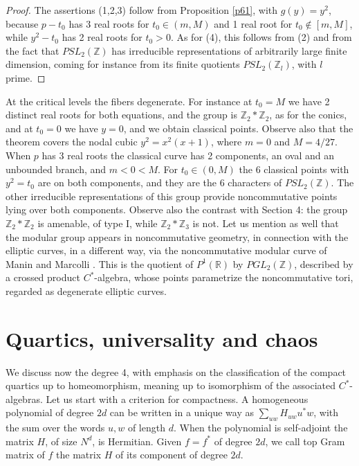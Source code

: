 \documentclass[11pt]{amsart}
\theoremstyle{definition}
\begin{document}
\begin{proof}
The assertions (1,2,3) follow from Proposition \ref{p61}, with $g(y)=y^2$, because $p-t_0$ has 3 real roots for $t_0\in(m,M)$ and 1 real root for $t_0\notin[m,M]$, while $y^2-t_0$ has 2 real roots for $t_0>0$. As for (4), this follows from (2) and from the fact that $PSL_2(\mathbb Z)$ has irreducible representations of arbitrarily large finite dimension, coming for instance from its finite quotients $PSL_2(\mathbb Z_l)$, with $l$ prime.
\end{proof}

At the critical levels the fibers degenerate. For instance at $t_0=M$ we have 2 distinct real roots for both equations, and the group is $\mathbb Z_2*\mathbb Z_2$, as for the conics, and at $t_0=0$ we have $y=0$, and we obtain classical points. Observe also that the theorem covers the nodal cubic $y^2=x^2(x+1)$, where $m=0$ and $M=4/27$. When $p$ has 3 real roots the classical curve has 2 components, an oval and an unbounded branch, and $m<0<M$. For $t_0\in(0,M)$ the 6 classical points with $y^2=t_0$ are on both components, and they are the 6 characters of $PSL_2(\mathbb Z)$. The other irreducible representations of this group provide noncommutative points lying over both components. Observe also the contrast with Section 4: the group $\mathbb Z_2*\mathbb Z_2$ is amenable, of type I, while $\mathbb Z_2*\mathbb Z_3$ is not. Let us mention as well that the modular group appears in noncommutative geometry, in connection with the elliptic curves, in a different way, via the noncommutative modular curve of Manin and Marcolli \cite{mma}. This is the quotient of $P^1(\mathbb R)$ by $PGL_2(\mathbb Z)$, described by a crossed product $C^*$-algebra, whose points parametrize the noncommutative tori, regarded as degenerate elliptic curves.

\section{Quartics, universality and chaos}

We discuss now the degree 4, with emphasis on the classification of the compact quartics up to homeomorphism, meaning up to isomorphism of the associated $C^*$-algebras. Let us start with a criterion for compactness. A homogeneous polynomial of degree $2d$ can be written in a unique way as $\sum_{uw}H_{uw}u^*w$, with the sum over the words $u,w$ of length $d$. When the polynomial is self-adjoint the matrix $H$, of size $N^d$, is Hermitian. Given $f=f^*$ of degree $2d$, we call top Gram matrix of $f$ the matrix $H$ of its component of degree $2d$.
\end{document}
